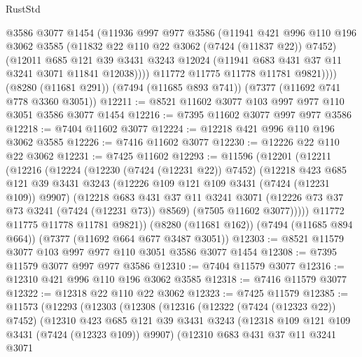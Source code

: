 \begin{lexlean}{RustStd}
\begin{coremodule}
            @3586
            @3077
            @1454
            (@11936
              @997
              @977
              @3586
              (@11941
                @421
                @996
                @110
                @196
                @3062
                @3585
                (@11832 @22 @110 @22 @3062 (@7424 (@11837 @22)) @7452)
                (@12011
                  @685
                  @121
                  @39
                  @3431
                  @3243
                  @12024
                  (@11941 @683 @431 @37 @11 @3241 @3071 @11841 @12038))))
            @11772
            @11775
            @11778
            @11781
            @9821))))
    (@8280 (@11681 @291))
    (@7494 (@11685 @893 @741))
    (@7377 (@11692 @741 @778 @3360 @3051))
@12211 := @8521 @11602 @3077 @103 @997 @977 @110 @3051 @3586 @3077 @1454
@12216 := @7395 @11602 @3077 @997 @977 @3586
@12218 := @7404 @11602 @3077
@12224 := @12218 @421 @996 @110 @196 @3062 @3585
@12226 := @7416 @11602 @3077
@12230 := @12226 @22 @110 @22 @3062
@12231 := @7425 @11602
@12293 := @11596
    (@12201
      (@12211
        (@12216
          (@12224
            (@12230 (@7424 (@12231 @22)) @7452)
            (@12218
              @423
              @685
              @121
              @39
              @3431
              @3243
              (@12226 @109 @121 @109 @3431 (@7424 (@12231 @109)) @9907)
              (@12218
                @683
                @431
                @37
                @11
                @3241
                @3071
                (@12226 @73 @37 @73 @3241 (@7424 (@12231 @73)) @8569)
                (@7505 @11602 @3077)))))
        @11772
        @11775
        @11778
        @11781
        @9821))
    (@8280 (@11681 @162))
    (@7494 (@11685 @894 @664))
    (@7377 (@11692 @664 @677 @3487 @3051))
@12303 := @8521 @11579 @3077 @103 @997 @977 @110 @3051 @3586 @3077 @1454
@12308 := @7395 @11579 @3077 @997 @977 @3586
@12310 := @7404 @11579 @3077
@12316 := @12310 @421 @996 @110 @196 @3062 @3585
@12318 := @7416 @11579 @3077
@12322 := @12318 @22 @110 @22 @3062
@12323 := @7425 @11579
@12385 := @11573
    (@12293
      (@12303
        (@12308
          (@12316
            (@12322 (@7424 (@12323 @22)) @7452)
            (@12310
              @423
              @685
              @121
              @39
              @3431
              @3243
              (@12318 @109 @121 @109 @3431 (@7424 (@12323 @109)) @9907)
              (@12310
                @683
                @431
                @37
                @11
                @3241
                @3071

\end{coremodule}
\end{lexlean}
